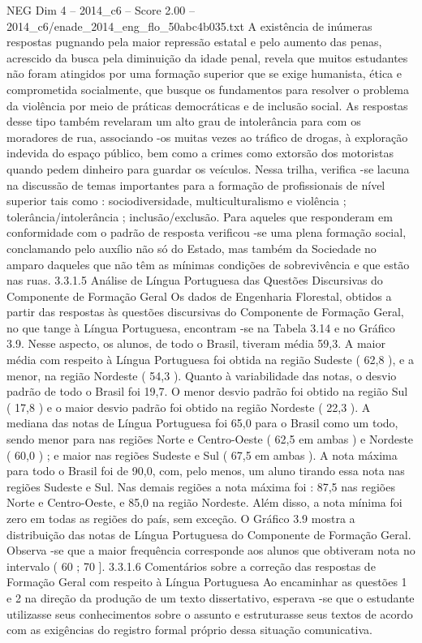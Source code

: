 \begin{textsample}{NEG Dim 4 – 2014\_c6 – Score 2.00 – 2014\_c6/enade\_2014\_eng\_flo\_50abc4b035.txt}
A existência de inúmeras respostas pugnando pela maior repressão estatal e pelo aumento das penas, acrescido da busca pela diminuição da idade penal, revela que muitos estudantes não foram atingidos por uma formação superior que se exige humanista, ética e comprometida socialmente, que busque os fundamentos para resolver o problema da violência por meio de práticas democráticas e de inclusão social.
As respostas desse tipo também revelaram um alto grau de intolerância para com os moradores de rua, associando -os muitas vezes ao tráfico de drogas, à exploração indevida do espaço público, bem como a crimes como extorsão dos motoristas quando pedem dinheiro para guardar os veículos.
Nessa trilha, verifica -se lacuna na discussão de temas importantes para a formação de profissionais de nível superior tais como : sociodiversidade, multiculturalismo e violência ; tolerância/intolerância ; inclusão/exclusão.
Para aqueles que responderam em conformidade com o padrão de resposta verificou -se uma plena formação social, conclamando pelo auxílio não só do Estado, mas também da Sociedade no amparo daqueles que não têm as mínimas condições de sobrevivência e que estão nas ruas. 3.3.1.5 Análise de Língua Portuguesa das Questões Discursivas do Componente de Formação Geral Os dados de Engenharia Florestal, obtidos a partir das respostas às questões discursivas do Componente de Formação Geral, no que tange à Língua Portuguesa, encontram -se na Tabela 3.14 e no Gráfico 3.9.
Nesse aspecto, os alunos, de todo o Brasil, tiveram média 59,3.
A maior média com respeito à Língua Portuguesa foi obtida na região Sudeste ( 62,8 ), e a menor, na região Nordeste ( 54,3 ).
Quanto à variabilidade das notas, o desvio padrão de todo o Brasil foi 19,7.
O menor desvio padrão foi obtido na região Sul ( 17,8 ) e o maior desvio padrão foi obtido na região Nordeste ( 22,3 ).
A mediana das notas de Língua Portuguesa foi 65,0 para o Brasil como um todo, sendo menor para nas regiões Norte e Centro-Oeste ( 62,5 em ambas ) e Nordeste ( 60,0 ) ; e maior nas regiões Sudeste e Sul ( 67,5 em ambas ).
A nota máxima para todo o Brasil foi de 90,0, com, pelo menos, um aluno tirando essa nota nas regiões Sudeste e Sul.
Nas demais regiões a nota máxima foi : 87,5 nas regiões Norte e Centro-Oeste, e 85,0 na região Nordeste.
Além disso, a nota mínima foi zero em todas as regiões do país, sem exceção.
O Gráfico 3.9 mostra a distribuição das notas de Língua Portuguesa do Componente de Formação Geral.
Observa -se que a maior frequência corresponde aos alunos que obtiveram nota no intervalo ( 60 ; 70 ]. 3.3.1.6 Comentários sobre a correção das respostas de Formação Geral com respeito à Língua Portuguesa Ao encaminhar as questões 1 e 2 na direção da produção de um texto dissertativo, esperava -se que o estudante utilizasse seus conhecimentos sobre o assunto e estruturasse seus textos de acordo com as exigências do registro formal próprio dessa situação comunicativa.

\end{textsample}

